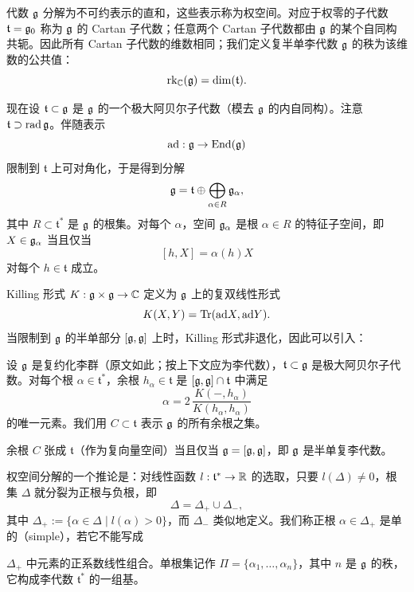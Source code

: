 代数 $\mathfrak{g}$ 分解为不可约表示的直和，这些表示称为权空间。对应于权零的子代数 $\mathfrak{t}=\mathfrak{g}_0$ 称为 $\mathfrak{g}$ 的 Cartan 子代数；任意两个 Cartan 子代数都由 $\mathfrak{g}$ 的某个自同构共轭。因此所有 Cartan 子代数的维数相同；我们定义复半单李代数 $\mathfrak{g}$ 的秩为该维数的公共值：
\[
\operatorname{rk}_{\mathbb{C}}(\mathfrak{g})=\dim(\mathfrak{t}).
\]

现在设 $\mathfrak{t}\subset\mathfrak{g}$ 是 $\mathfrak{g}$ 的一个极大阿贝尔子代数（模去 $\mathfrak{g}$ 的内自同构）。注意 $\mathfrak{t}\supset\operatorname{rad}\mathfrak{g}$。伴随表示
\[
\mathrm{ad}:\mathfrak{g}\to\operatorname{End}(\mathfrak{g})
\]
限制到 $\mathfrak{t}$ 上可对角化，于是得到分解
\[
\mathfrak{g}=\mathfrak{t}\oplus\bigoplus_{\alpha\in R}\mathfrak{g}_\alpha,
\]
其中 $R\subset\mathfrak{t}^{*}$ 是 $\mathfrak{g}$ 的根集。对每个 $\alpha$，空间 $\mathfrak{g}_\alpha$ 是根 $\alpha\in R$ 的特征子空间，即 $X\in\mathfrak{g}_\alpha$ 当且仅当
\[
[h,X]=\alpha(h)X
\]
对每个 $h\in\mathfrak{t}$ 成立。

Killing 形式 $K:\mathfrak{g}\times\mathfrak{g}\to\mathbb{C}$ 定义为 $\mathfrak{g}$ 上的复双线性形式
\[
K(X,Y)=\operatorname{Tr}(\mathrm{ad}X,\mathrm{ad}Y).
\]
当限制到 $\mathfrak{g}$ 的半单部分 $[\mathfrak{g},\mathfrak{g}]$ 上时，Killing 形式非退化，因此可以引入：

\begin{definition}[A.2] 设 $\mathfrak{g}$ 是复约化李群（原文如此；按上下文应为李代数），$\mathfrak{t}\subset\mathfrak{g}$ 是极大阿贝尔子代数。对每个根 $\alpha\in\mathfrak{t}^{*}$，余根 $h_\alpha\in\mathfrak{t}$ 是 $[\mathfrak{g},\mathfrak{g}]\cap\mathfrak{t}$ 中满足
\[
\alpha=2\,\frac{K(-,h_\alpha)}{K(h_\alpha,h_\alpha)}
\]
的唯一元素。我们用 $C\subset\mathfrak{t}$ 表示 $\mathfrak{g}$ 的所有余根之集。
\end{definition}


\begin{remark}[A.3] 余根 $C$ 张成 $\mathfrak{t}$（作为复向量空间）当且仅当 $\mathfrak{g}=[\mathfrak{g},\mathfrak{g}]$，即 $\mathfrak{g}$ 是半单复李代数。
\end{remark}

权空间分解的一个推论是：对线性函数 $l:\mathfrak{t}^{*}\to\mathbb{R}$ 的选取，只要 $l(\Delta)\ne0$，根集 $\Delta$ 就分裂为正根与负根，即
\[
\Delta=\Delta_+\cup\Delta_-,
\]
其中 $\Delta_+:=\{\alpha\in\Delta\mid l(\alpha)>0\}$，而 $\Delta_-$ 类似地定义。我们称正根 $\alpha\in\Delta_+$ 是单的（simple），若它不能写成

$\Delta_+$ 中元素的正系数线性组合。单根集记作 $\Pi=\{\alpha_1,\dots,\alpha_n\}$，其中 $n$ 是 $\mathfrak{g}$ 的秩，它构成李代数 $\mathfrak{t}^{*}$ 的一组基。

